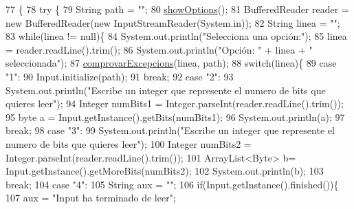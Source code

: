 \begin{DoxyCode}
77                                            \{
78         \textcolor{keywordflow}{try} \{
79             String path = \textcolor{stringliteral}{""};
80             \hyperlink{classpersistencia_1_1input_1_1Driver____Input_a4f8a0f13847071d675771817ee212f2c}{showOptions}();
81             BufferedReader reader = \textcolor{keyword}{new} BufferedReader(\textcolor{keyword}{new} InputStreamReader(System.in));
82             String linea = \textcolor{stringliteral}{""};
83             \textcolor{keywordflow}{while}(linea != null)\{
84                 System.out.println(\textcolor{stringliteral}{"Selecciona una opción:"});
85                 linea = reader.readLine().trim();
86                 System.out.println(\textcolor{stringliteral}{"Opción: "} + linea + \textcolor{stringliteral}{" seleccionada"});
87                 \hyperlink{classpersistencia_1_1input_1_1Driver____Input_a0d86ebc99984018efe2b52c6f97de708}{comprovarExcepcions}(linea, path);
88                 \textcolor{keywordflow}{switch}(linea)\{
89                     \textcolor{keywordflow}{case} \textcolor{stringliteral}{"1"}:
90                         Input.initialize(path);
91                     \textcolor{keywordflow}{break};
92                     \textcolor{keywordflow}{case} \textcolor{stringliteral}{"2"}:
93                         System.out.println(\textcolor{stringliteral}{"Escribe un integer que represente el numero de bits que quieres
       leer"});
94                         Integer numBits1 = Integer.parseInt(reader.readLine().trim());
95                         byte a = Input.getInstance().getBits(numBits1);
96                         System.out.println(a);
97                     \textcolor{keywordflow}{break};
98                     \textcolor{keywordflow}{case} \textcolor{stringliteral}{"3"}:
99                         System.out.println(\textcolor{stringliteral}{"Escribe un integer que represente el numero de bits que quieres
       leer"});
100                         Integer numBits2 = Integer.parseInt(reader.readLine().trim());
101                         ArrayList<Byte> b= Input.getInstance().getMoreBits(numBits2);
102                         System.out.println(b);
103                     \textcolor{keywordflow}{break};
104                     \textcolor{keywordflow}{case} \textcolor{stringliteral}{"4"}:
105                         String aux = \textcolor{stringliteral}{""};
106                         \textcolor{keywordflow}{if}(Input.getInstance().finished())\{
107                             aux = \textcolor{stringliteral}{"Input ha terminado de leer"};

\end{DoxyCode}
